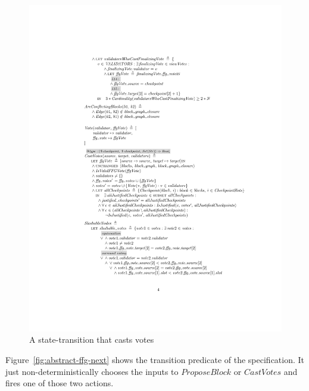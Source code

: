 \begin{figure}
    \centering
    \includegraphics[width=\textwidth]{images/abstract-ffg-cast-votes.pdf}  %
    \caption{A state-transition that casts votes}\label{fig:abstract-ffg-cast-votes}
\end{figure}

Figure~\ref{fig:abstract-ffg-next} shows the transition predicate of the
specification. It just non-deterministically chooses the inputs to
$\textit{ProposeBlock}$ or $\textit{CastVotes}$ and fires one of those two
actions.


